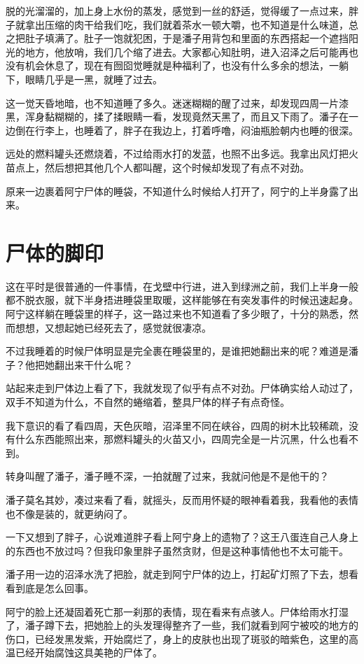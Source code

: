 脱的光溜溜的，加上身上水份的蒸发，感觉到一丝的舒适，觉得缓了一点过来，胖子就拿出压缩的肉干给我们吃，我们就着茶水一顿大嚼，也不知道是什么味道，总之把肚子填满了。肚子一饱就犯困，于是潘子用背包和里面的东西搭起一个遮挡阳光的地方，他放哨，我们几个缩了进去。大家都心知肚明，进入沼泽之后可能再也没有机会休息了，现在有囫囵觉睡就是种福利了，也没有什么多余的想法，一躺下，眼睛几乎是一黑，就睡了过去。

这一觉天昏地暗，也不知道睡了多久。迷迷糊糊的醒了过来，却发现四周一片漆黑，浑身黏糊糊的，揉了揉眼睛一看，发现竟然天黑了，而且又下雨了。潘子在一边倒在行李上，也睡着了，胖子在我边上，打着呼噜，闷油瓶脸朝内也睡的很深。

远处的燃料罐头还燃烧着，不过给雨水打的发蓝，也照不出多远。我拿出风灯把火苗点上，然后想把其他几个人都叫醒，这个时候却发现了有点不对劲。

原来一边裹着阿宁尸体的睡袋，不知道什么时候给人打开了，阿宁的上半身露了出来。

\chapter{尸体的脚印}

这在平时是很普通的一件事情，在戈壁中行进，进入到绿洲之前，我们上半身一般都不脱衣服，就下半身捂进睡袋里取暖，这样能够在有突发事件的时候迅速起身。阿宁这样躺在睡袋里的样子，这一路过来也不知道看了多少眼了，十分的熟悉，然而想想，又想起她已经死去了，感觉就很凄凉。

不过我睡着的时候尸体明显是完全裹在睡袋里的，是谁把她翻出来的呢？难道是潘子？他把她翻出来干什么呢？

站起来走到尸体边上看了下，我就发现了似乎有点不对劲。尸体确实给人动过了，双手不知道为什么，不自然的蜷缩着，整具尸体的样子有点奇怪。

我下意识的看了看四周，天色灰暗，沼泽里不同在峡谷，四周的树木比较稀疏，没有什么东西能照出来，那燃料罐头的火苗又小，四周完全是一片沉黑，什么也看不到。

转身叫醒了潘子，潘子睡不深，一拍就醒了过来，我就问他是不是他干的？

潘子莫名其妙，凑过来看了看，就摇头，反而用怀疑的眼神看着我，我看他的表情也不像是装的，就更纳闷了。

一下又想到了胖子，心说难道胖子看上阿宁身上的遗物了？这王八蛋连自己人身上的东西也不放过吗？但我印象里胖子虽然贪财，但是这种事情他也不太可能干。

潘子用一边的沼泽水洗了把脸，就走到阿宁尸体的边上，打起矿灯照了下去，想看看到底是怎么回事。

阿宁的脸上还凝固着死亡那一刹那的表情，现在看来有点骇人。尸体给雨水打湿了，潘子蹲下去，把她脸上的头发理得整齐了一些，我们就看到阿宁被咬的地方的伤口，已经发黑发紫，开始腐烂了，身上的皮肤也出现了斑驳的暗紫色，这里的高温已经开始腐蚀这具美艳的尸体了。


